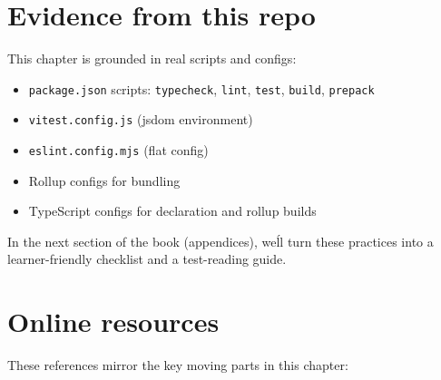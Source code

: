 \section{Evidence from this repo}

This chapter is grounded in real scripts and configs:

\begin{itemize}
\item \texttt{package.json} scripts: \texttt{typecheck}, \texttt{lint}, \texttt{test}, \texttt{build}, \texttt{prepack}
\item \texttt{vitest.config.js} (jsdom environment)
\item \texttt{eslint.config.mjs} (flat config)
\item Rollup configs for bundling
\item TypeScript configs for declaration and rollup builds
\end{itemize}

In the next section of the book (appendices), we\'ll turn these practices into a learner-friendly checklist and a test-reading guide.

\section{Online resources}

These references mirror the key moving parts in this chapter:

